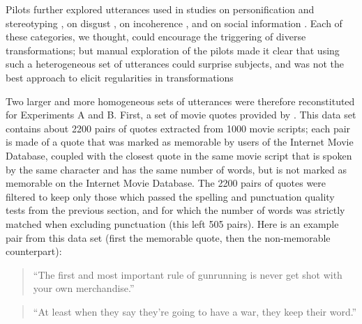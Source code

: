 \documentclass[a4paper,fleqn]{cas-dc}
\begin{document}
Pilots further explored utterances used in studies on personification and
stereotyping \citep{bangerter_transformation_2000}, on disgust
\citep{heath_emotional_2001}, on incoherence
\citep{maxwell_remembering_1936}, and on social information
\citep{mesoudi_bias_2006}. Each of these categories, we thought, could
encourage the triggering of diverse transformations; but manual exploration of
the pilots made it clear that using such a heterogeneous set of utterances could
surprise subjects, and was not the best approach to elicit regularities in
transformations

Two larger and more homogeneous sets of utterances were therefore reconstituted
for Experiments A and B. First, a set of movie quotes provided by
\citet{danescu-niculescu-mizil_you_2012}. This data set contains about 2200
pairs of quotes extracted from 1000 movie scripts; each pair is made of a quote
that was marked as memorable by users of the Internet Movie Database, coupled
with the closest quote in the same movie script that is spoken by the same
character and has the same number of words, but is not marked as memorable on the
Internet Movie Database. The 2200 pairs of quotes were filtered to keep only
those which passed the spelling and punctuation quality tests from the previous
section, and for which the number of words was strictly matched when excluding
punctuation (this left 505 pairs). Here is an example pair from this data set
(first the memorable quote, then the non-memorable counterpart):

\begin{quote}
\enquote{The first and most important rule of gunrunning is never get
shot with your own merchandise.}
\end{quote}

\begin{quote}
\enquote{At least when they say they're going to have a war, they keep
their word.}
\end{quote}
\end{document}

